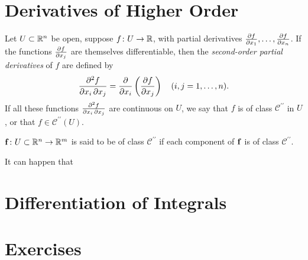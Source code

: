 \section{Derivatives of Higher Order}
\begin{definition}
Let $U\subset\mathbb R^n$ be open, suppose $f\colon U\to\mathbb R$, with partial derivatives $\pdv{f}{x_1},\dots,\pdv{f}{x_n}$. If the functions $\pdv{f}{x_j}$ are themselves differentiable, then the \emph{second-order partial derivatives} of $f$ are defined by
\[\pdv{f}{x_i,x_j}=\pdv{}{x_i}\left(\pdv{f}{x_j}\right)\quad(i,j=1,\dots,n).\]
If all these functions $\pdv{f}{x_i,x_j}$ are continuous on $U$, we say that $f$ is of class $\mathcal{C}^{\prime\prime}$ in $U$, or that $f\in\mathcal{C}^{\prime\prime}(U)$.

$\vb{f}\colon U\subset\mathbb R^n\to\mathbb R^m$ is said to be of class $\mathcal{C}^{\prime\prime}$ if each component of $\vb{f}$ is of class $\mathcal{C}^{\prime\prime}$.
\end{definition}

It can happen that 

\section{Differentiation of Integrals}

\pagebreak

\section*{Exercises}
